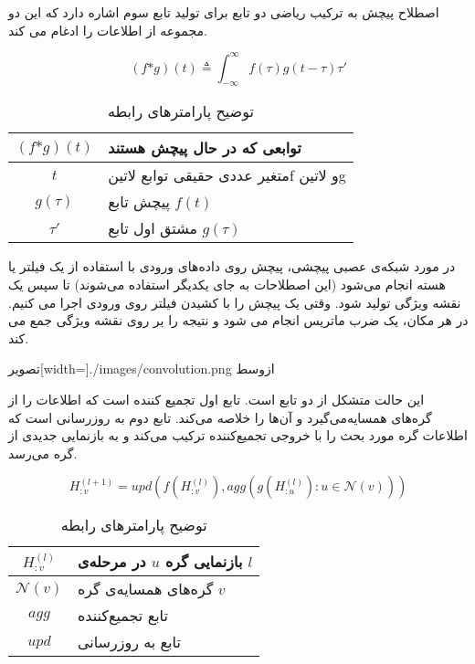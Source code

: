 
اصطلاح پیچش به ترکیب ریاضی دو تابع برای تولید تابع سوم اشاره دارد که این دو مجموعه از اطلاعات را ادغام می کند.

\begin{equation}
  \label{eq:conv}
(f \text{*} g)(t) \triangleq \int_{-\infty}^\infty f(\tau)g(t - \tau)\tau'
\end{equation}


\begin{table}[h]
  \centering
  \caption{توضیح پارامترهای رابطه }
  \begin{tabular}{|c|p{}|}
    \hline
    $(f \text{*} g)(t)$ & توابعی که در حال پیچش هستند \\
    \hline
    $t$ & متغیر عددی حقیقی توابع ‌لاتین{f}  و ‌لاتین{g} \\
    \hline
    $g(\tau)$ & پیچش تابع $f(t)$ \\
    \hline
    $\tau'$ & مشتق اول تابع $g(\tau)$ \\
    \hline
  \end{tabular}
  \label{tbl:distance}
\end{table}

در مورد شبکه‌ی عصبی پیچشی، پیچش روی داده‌های ورودی با استفاده از یک فیلتر یا هسته انجام می‌شود (این اصطلاحات به جای یکدیگر استفاده می‌شوند) تا سپس یک نقشه ویژگی تولید شود. وقتی یک پیچش را با کشیدن فیلتر روی ورودی اجرا می کنیم. در هر مکان، یک ضرب ماتریس انجام می شود و نتیجه را بر روی نقشه ویژگی جمع می کند.

  ‌تصویر[width=\textwidth]{./images/convolution.png}
  ‌ازوسط


این حالت متشکل از دو تابع است. تابع اول تجمیع کننده است که اطلاعات را از گره‌های همسایه‌می‌گیرد و آن‌ها را خلاصه می‌کند. تابع دوم به روزرسانی است که اطلاعات گره مورد بحث را با خروجی تجمیع‌کننده ترکیب می‌کند و به بازنمایی جدیدی از گره می‌رسد.

\begin{equation}
  \label{eq:spatial}
H_{:v}^{(l+1)}=upd(f(H_{:v}^{(l)}),agg(g(H_{:u}^{(l)}): u\in \mathcal{N}(v)))
\end{equation}

\begin{table}[h]
  \centering
  \caption{توضیح پارامترهای رابطه }
  \begin{tabular}{|c|p{}|}
    \hline
    $H_{:v}^{(l)}$ & بازنمایی گره $u$ در مرحله‌ی $l$ \\
    \hline
    $\mathcal{N}(v)$ & گره‌های همسایه‌ی گره $v$ \\
    \hline
    $agg$ & تابع تجمیع‌کننده \\
    \hline
    $upd$ & تابع به روزرسانی \\
    \hline
  \end{tabular}
  \label{tbl:distance}
\end{table}

